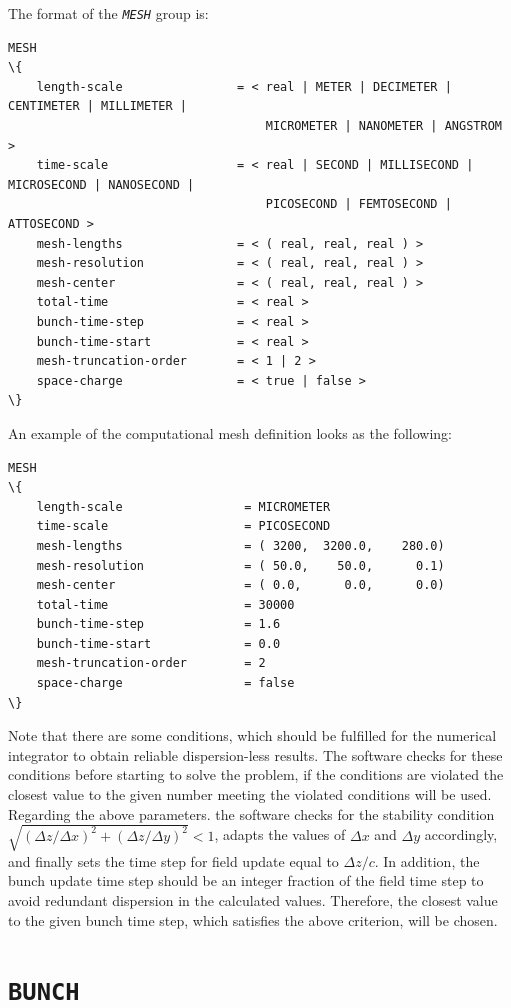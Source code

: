 The format of the {\tt \em \small MESH} group is:
%
\begin{Verbatim}[frame=single, fontsize=\small, tabsize=4, fontfamily=courier, fontseries=b, commandchars=\\\{\}, obeytabs]
MESH
\{
	length-scale				= < real | METER | DECIMETER | CENTIMETER | MILLIMETER | 
									MICROMETER | NANOMETER | ANGSTROM >
	time-scale					= < real | SECOND | MILLISECOND | MICROSECOND | NANOSECOND | 
									PICOSECOND | FEMTOSECOND |	ATTOSECOND >
	mesh-lengths				= < ( real, real, real ) >
	mesh-resolution		 		= < ( real, real, real ) >
	mesh-center				 	= < ( real, real, real ) >
	total-time					= < real >
	bunch-time-step		 		= < real >
	bunch-time-start  			= < real >
	mesh-truncation-order 		= < 1 | 2 >
	space-charge  				= < true | false >
\}
\end{Verbatim}
An example of the computational mesh definition looks as the following:
\begin{snugshade}
\begin{Verbatim}[fontsize=\small, tabsize=4, fontfamily=courier, fontseries=b, commandchars=\\\{\}, obeytabs]
MESH
\{
	length-scale 				 = MICROMETER
	time-scale					 = PICOSECOND
	mesh-lengths				 = ( 3200,  3200.0,    280.0)
	mesh-resolution				 = ( 50.0,    50.0,      0.1)
	mesh-center					 = ( 0.0,      0.0,      0.0)
	total-time 					 = 30000
	bunch-time-step				 = 1.6
	bunch-time-start			 = 0.0
	mesh-truncation-order		 = 2
	space-charge				 = false
\}
\end{Verbatim}
\end{snugshade}
%
Note that there are some conditions, which should be fulfilled for the numerical integrator to obtain reliable dispersion-less results.
%
The software checks for these conditions before starting to solve the problem, if the conditions are violated the closest value to the given number meeting the violated conditions will be used.
%
Regarding the above parameters. the software checks for the stability condition $\sqrt{(\Delta z/\Delta x)^2+ (\Delta z/\Delta y)^2} < 1$, adapts the values of $\Delta x$ and $\Delta y$ accordingly, and finally sets the time step for field update equal to $\Delta z / c$.
%
In addition, the bunch update time step should be an integer fraction of the field time step to avoid redundant dispersion in the calculated values.
%
Therefore, the closest value to the given bunch time step, which satisfies the above criterion, will be chosen.

\section{\texttt{BUNCH}}

